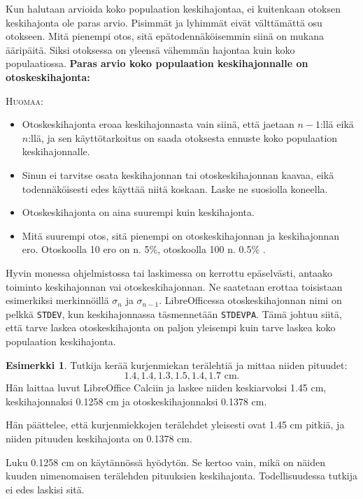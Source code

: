 \documentclass[12pt,leqno,a4paper,oneside]{amsart}
\theoremstyle{definition}
\newtheorem{example}[proclaim]{Esimerkki}
\theoremstyle{remark}
\numberwithin{equation}{section}
\begin{document}
Kun halutaan arvioida koko populaation keskihajontaa, ei kuitenkaan otoksen keskihajonta ole paras arvio. Pisimmät ja lyhimmät eivät
välttämättä osu otokseen. Mitä pienempi otos, sitä epätodennäköisem\-min siinä on mukana ääripäitä. Siksi otoksessa on yleensä vähemmän
hajontaa kuin koko populaatiossa. \textbf{Paras arvio koko populaation keskihajonnalle on otoskeskihajonta:}



\textsc{Huomaa:}
\begin{itemize}
\item
Otoskeskihajonta eroaa keskihajonnasta vain siinä, että jaetaan $n-1$:llä eikä $n$:llä, ja sen käyttötarkoitus on saada otoksesta
ennuste koko populaation keskihajonnalle. 
 \item Sinun ei tarvitse osata keskihajonnan tai otoskeskihajonnan kaavaa, eikä todennäköisesti edes käyttää niitä koskaan.
 Laske ne suosiolla koneella.
 \item Otoskeskihajonta on aina suurempi kuin keskihajonta.
 \item Mitä suurempi otos, sitä pienempi on otoskeskihajonnan ja keskihajonnan ero. Otoskoolla 10 ero on n. 5\%, otoskoolla
 100 n. 0.5\% .
\end{itemize}


Hyvin monessa ohjelmistossa tai laskimessa on kerrottu epäselvästi, antaako toiminto
keskihajonnan vai otoskeskihajonnan. Ne saatetaan erottaa toisistaan esimerkiksi merkinnöillä $\sigma_n$ ja $\sigma_{n-1}$. Libre\-Officessa
otoskeskihajonnan nimi on pelkkä \texttt{STDEV}, kun keskihajonnassa täs\-men\-ne\-tään \texttt{STDEVPA}. Tämä johtuu siitä, että tarve laskea
otos\-keskihajonta on paljon yleisempi kuin tarve laskea koko populaation keskihajonta.

\begin{example}
 Tutkija kerää kurjenmiekan terälehtiä ja mittaa niiden pituudet:
 $$1.4, 1.4, 1.3, 1.5, 1.4, 1.7 \text{ cm.}$$
 Hän laittaa luvut LibreOffice Calciin ja laskee niiden keskiarvoksi 1.45 cm, keskihajonnaksi 0.1258 cm ja otoskeskihajonnaksi 0.1378 cm.
 
 Hän päättelee, että kurjenmiekkojen terälehdet yleisesti ovat 1.45 cm pitkiä, ja niiden pituuden keskihajonta on 0.1378 cm.
 
 Luku 0.1258 cm on käytännössä hyödytön. Se kertoo vain, mikä on näiden kuuden nimenomaisen terälehden pituuksien keskihajonta. Todellisuudessa
 tutkija ei edes laskisi sitä.
\end{example}
\end{document}
